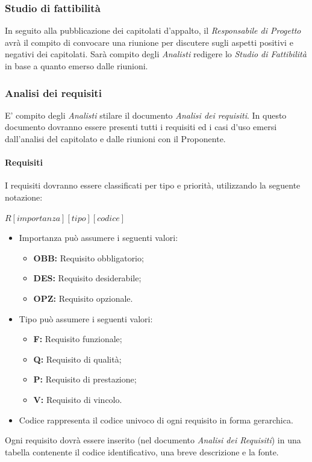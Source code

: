 \subsubsection{Studio di fattibilità}
In seguito alla pubblicazione dei capitolati d'appalto, il \textit{Responsabile di Progetto} avrà il compito di convocare una riunione per discutere sugli aspetti positivi e negativi dei capitolati. Sarà compito degli \textit{Analisti} redigere lo \textit{Studio di Fattibilità} in base a quanto emerso dalle riunioni.

\subsubsection{Analisi dei requisiti}
E' compito degli \textit{Analisti} stilare il documento \textit{Analisi dei requisiti}.
In questo documento dovranno essere presenti tutti i requisiti ed i \gls{casi d'uso} emersi dall'analisi del capitolato e dalle riunioni con il Proponente.\\

\newpage
\paragraph{Requisiti}

I requisiti dovranno essere classificati per tipo e priorità, utilizzando la seguente notazione:

\begin{center}
	\begin{math}
		R \left [ importanza \right ] \left [ tipo\right ]\left [codice\right ]
	\end{math}
\end{center}
\begin{itemize}
	\item Importanza può assumere i seguenti valori:
	\begin{itemize}
		\item \textbf{OBB:} Requisito obbligatorio;
		\item \textbf{DES:} Requisito desiderabile;
		\item \textbf{OPZ:} Requisito opzionale.
	\end{itemize}
	\item Tipo può assumere i seguenti valori:
	\begin{itemize}
		\item \textbf{F:} Requisito funzionale;
		\item \textbf{Q:} Requisito di qualità;
		\item \textbf{P:} Requisito di prestazione;
		\item \textbf{V:} Requisito di vincolo.
	\end{itemize}
	\item Codice rappresenta il codice univoco di ogni requisito in forma gerarchica.
\end{itemize}
Ogni requisito dovrà essere inserito (nel documento \textit{Analisi dei Requisiti}) in una tabella contenente il codice identificativo, una breve descrizione e la fonte.

